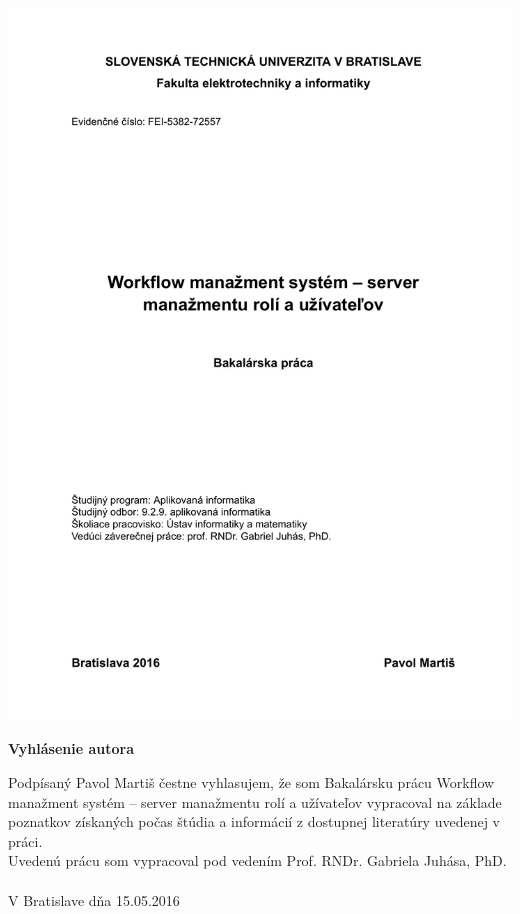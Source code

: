 \documentclass[12pt, oneside]{book}
\begin{document}
\eject %





\newpage 
\thispagestyle{empty}
\hspace{-2cm}\includegraphics[width=1.1\textwidth]{images/zadanie}


\frontmatter


\setcounter{page}{3}
\newpage 
\pagestyle{empty}
\noindent
\vfill
\begin{center}
	\LARGE \textbf{Vyhlásenie autora}  \\
\end{center}
Podpísaný Pavol Martiš čestne vyhlasujem, že som Bakalársku prácu Workflow manažment systém – server manažmentu rolí a užívateľov vypracoval na základe poznatkov získaných počas štúdia a informácií z dostupnej literatúry uvedenej v práci.\\
Uvedenú prácu som vypracoval pod vedením Prof. RNDr. Gabriela Juhása, PhD.\\\\
V Bratislave dňa 15.05.2016 \\\\\\
\end{document}
